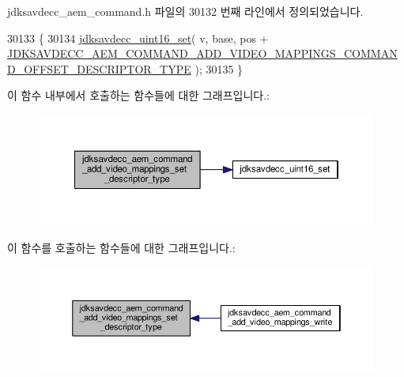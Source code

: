 jdksavdecc\+\_\+aem\+\_\+command.\+h 파일의 30132 번째 라인에서 정의되었습니다.


\begin{DoxyCode}
30133 \{
30134     \hyperlink{group__endian_ga14b9eeadc05f94334096c127c955a60b}{jdksavdecc\_uint16\_set}( v, base, pos + 
      \hyperlink{group__command__add__video__mappings_ga3127188c563e5d2b980716cb79540903}{JDKSAVDECC\_AEM\_COMMAND\_ADD\_VIDEO\_MAPPINGS\_COMMAND\_OFFSET\_DESCRIPTOR\_TYPE}
       );
30135 \}
\end{DoxyCode}


이 함수 내부에서 호출하는 함수들에 대한 그래프입니다.\+:
\nopagebreak
\begin{figure}[H]
\begin{center}
\leavevmode
\includegraphics[width=350pt]{group__command__add__video__mappings_ga9c3f04377c83c98312c4e661e98f13db_cgraph}
\end{center}
\end{figure}




이 함수를 호출하는 함수들에 대한 그래프입니다.\+:
\nopagebreak
\begin{figure}[H]
\begin{center}
\leavevmode
\includegraphics[width=350pt]{group__command__add__video__mappings_ga9c3f04377c83c98312c4e661e98f13db_icgraph}
\end{center}
\end{figure}


